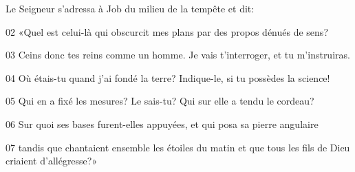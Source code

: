 Le Seigneur s’adressa à Job du milieu de la tempête et dit:

02 «Quel est celui-là qui obscurcit mes plans par des propos dénués de sens?

03 Ceins donc tes reins comme un homme. Je vais t’interroger, et tu m’instruiras.

04 Où étais-tu quand j’ai fondé la terre? Indique-le, si tu possèdes la science!

05 Qui en a fixé les mesures? Le sais-tu? Qui sur elle a tendu le cordeau?

06 Sur quoi ses bases furent-elles appuyées, et qui posa sa pierre angulaire

07 tandis que chantaient ensemble les étoiles du matin et que tous les fils de Dieu criaient d’allégresse?»
